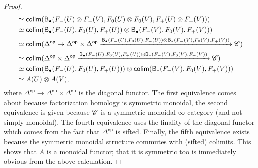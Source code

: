 \documentclass[../text]{subfiles}
\begin{document}
\begin{proof}
\begin{align}
        &\simeq \mathsf{colim} (\mathsf{B}_{\bullet} (F_-(U) \otimes F_-(V), F_0(U) \otimes F_0(V), F_+(U) \otimes F_+(V)))\notag\\
        &\simeq \mathsf{colim} (\mathsf{B}_{\bullet} (F_-(U), F_0(U), F_+(U)) \otimes \mathsf{B}_{\bullet} (F_-(V), F_0(V), F_+(V)))\notag\\
        &\simeq \mathsf{colim} (\Delta^{\mathsf{op}} \rightarrow \Delta^{\mathsf{op}} \times \Delta^{\mathsf{op}} \xrightarrow{\mathsf{B}_{\bullet} (F_-(U), F_0(U), F_+(U)) \otimes \mathsf{B}_{*} (F_-(V), F_0(V), F_+(V))} \mathscr{C})\notag\\
        &\simeq \mathsf{colim} (\Delta^{\mathsf{op}} \times \Delta^{\mathsf{op}} \xrightarrow{\mathsf{B}_{\bullet} (F_-(U), F_0(U), F_+(U)) \otimes \mathsf{B}_{*} (F_-(V), F_0(V), F_+(V))} \mathscr{C})\notag\\
        &\simeq \mathsf{colim} (\mathsf{B}_{\bullet} (F_-(U), F_0(U), F_+(U))) \otimes \mathsf{colim} (\mathsf{B}_{*} (F_-(V), F_0(V), F_+(V)))\notag\\
        &\simeq A(U) \otimes A(V),
    \end{align}
    where $\Delta^{\mathsf{op}} \rightarrow \Delta^{\mathsf{op}} \times \Delta^{\mathsf{op}}$ is the diagonal functor. The first equivalence comes about because factorization homology is symmetric monoidal, the second equivalence is given because $\mathscr{C}$ is a symmetric monoidal $\infty$-category (and not simply monoidal). The fourth equivalence uses the finality of the diagonal functor which comes from the fact that $\Delta^{\mathsf{op}}$ is sifted. Finally, the fifth equivalence exists because the symmetric monoidal structure commutes with (sifted) colimits. This shows that $A$ is a monoidal functor; that it is symmetric too is immediately obvious from the above calculation. 
    

\end{proof}
\end{document}
